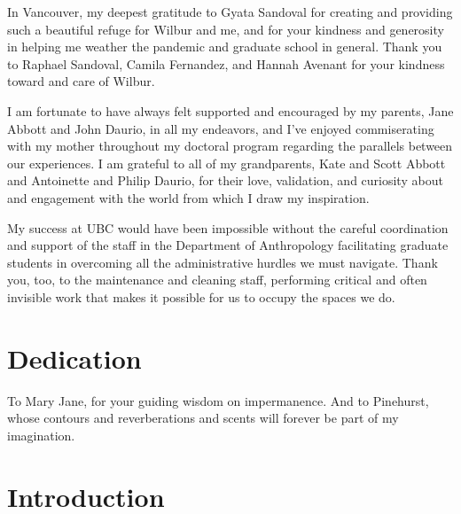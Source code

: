 \documentclass[
]{article}
\begin{document}
In Vancouver, my deepest gratitude to Gyata Sandoval for creating and providing such a beautiful refuge for Wilbur and me, and for your kindness and generosity in helping me weather the pandemic and graduate school in general. Thank you to Raphael Sandoval, Camila Fernandez, and Hannah Avenant for your kindness toward and care of Wilbur.

I am fortunate to have always felt supported and encouraged by my parents, Jane Abbott and John Daurio, in all my endeavors, and I've enjoyed commiserating with my mother throughout my doctoral program regarding the parallels between our experiences. I am grateful to all of my grandparents, Kate and Scott Abbott and Antoinette and Philip Daurio, for their love, validation, and curiosity about and engagement with the world from which I draw my inspiration.

My success at UBC would have been impossible without the careful coordination and support of the staff in the Department of Anthropology facilitating graduate students in overcoming all the administrative hurdles we must navigate. Thank you, too, to the maintenance and cleaning staff, performing critical and often invisible work that makes it possible for us to occupy the spaces we do.

\clearpage

\section*{Dedication}

\begin{center}
    \vspace*{\fill}
    To Mary Jane, for your guiding wisdom on impermanence. And to Pinehurst, whose contours and reverberations and scents will forever be part of my imagination.
    \vspace*{\fill}
\end{center}

\clearpage

\section{Introduction}\label{introduction}


\renewcommand{\thefigure}{1.\arabic{figure}}
\setcounter{figure}{0}
\renewcommand{\thetable}{1.\arabic{table}}
\setcounter{table}{0}
\renewcommand{\theequation}{1.\arabic{equation}}
\setcounter{equation}{0}
\end{document}
